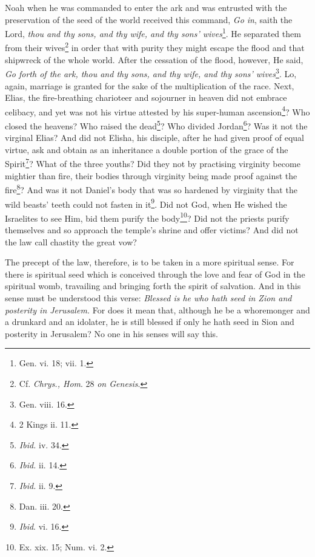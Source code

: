 Noah when he was commanded to enter the ark and was entrusted with the preservation of the seed of the world received this command, \emph{Go in}, saith the Lord, \emph{thou and thy sons, and thy wife, and thy sons’ wives}\footnote{Gen. vi. 18; vii. 1.}. He separated them from their wives\footnote{Cf. \emph{Chrys., Hom}. 28 \emph{on Genesis}.} in order that with purity they might escape the flood and that shipwreck of the whole world. After the cessation of the flood, however, He said, \emph{Go forth of the ark, thou and thy sons, and thy wife, and thy sons’ wives}\footnote{Gen. viii. 16.}. Lo, again, marriage is granted for the sake of the multiplication of the race. Next, Elias, the fire-breathing charioteer and sojourner in heaven did not embrace celibacy, and yet was not his virtue attested by his super-human ascension\footnote{2 Kings ii. 11.}? Who closed the heavens? Who raised the dead\footnote{\emph{Ibid.} iv. 34.}? Who divided Jordan\footnote{\emph{Ibid.} ii. 14.}? Was it not the virginal Elias? And did not Elisha, his disciple, after he had given proof of equal virtue, ask and obtain as an inheritance a double portion of the grace of the Spirit\footnote{\emph{Ibid.} ii. 9.}? What of the three youths? Did they not by practising virginity become mightier than fire, their bodies through virginity being made proof against the fire\footnote{Dan. iii. 20.}? And was it not Daniel’s body that was so hardened by virginity that the wild beasts’ teeth could not fasten in it\footnote{\emph{Ibid}. vi. 16.}. Did not God, when He wished the Israelites to see Him, bid them purify the body\footnote{Ex. xix. 15; Num. vi. 2.}? Did not the priests purify themselves and so approach the temple’s shrine and offer victims? And did not the law call chastity the great vow?

The precept of the law, therefore, is to be taken in a more spiritual sense. For there is spiritual seed which is conceived through the love and fear of God in the spiritual womb, travailing and bringing forth the spirit of salvation. And in this sense must be understood this verse: \emph{Blessed is he who hath seed in Zion and posterity in Jerusalem. }For does it mean that, although he be a whoremonger and a drunkard and an idolater, he is still blessed if only he hath seed in Sion and posterity in Jerusalem? No one in his senses will say this.


